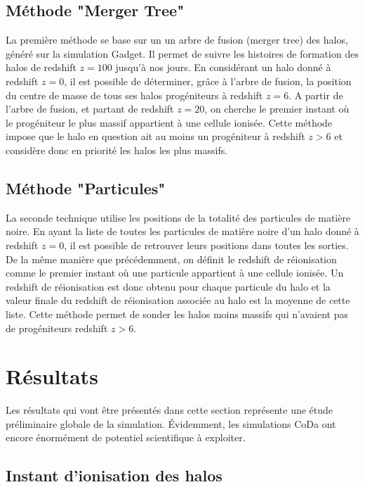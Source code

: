 \subsection{Méthode "Merger Tree"}
La première méthode se base sur un un arbre de fusion (merger tree) des halos, généré sur la simulation Gadget.
Il permet de suivre les histoires de formation des halos de redshift $z=100$ jusqu'à nos jours.
En considérant un halo donné à redshift $z=0$, il est possible de déterminer, grâce à l'arbre de fusion, la position du centre de masse de tous ses halos progéniteurs à redshift $z=6$.
A partir de l'arbre de fusion, et partant de redshift $z=20$, on cherche le premier instant où le progéniteur le plus massif appartient à une cellule ionisée.
Cette méthode impose que le halo en question ait au moins un progéniteur à redshift $z>6$ et considère donc en priorité les halos les plus massifs.

\subsection{Méthode "Particules"}
La seconde technique utilise les positions de la totalité des particules de matière noire.
En ayant la liste de toutes les particules de matière noire d'un halo donné à redshift $z=0$, il est possible de retrouver leurs positions dans toutes les sorties.
De la même manière que précédemment, on définit le redshift de réionisation comme le premier instant où une particule appartient à une cellule ionisée.
Un redshift de réionisation est donc obtenu pour chaque particule du halo et la valeur finale du redshift de réionisation associée au halo est la moyenne de cette liste.
Cette méthode permet de sonder les halos moins massifs qui n'avaient pas de progéniteurs redshift $z>6$.

\section{Résultats}

Les résultats qui vont être présentés dans cette section représente une étude préliminaire globale de la simulation.
Évidemment, les simulations \ac{CoDa} ont encore énormément de potentiel scientifique à exploiter.

\subsection{Instant d'ionisation des halos}

